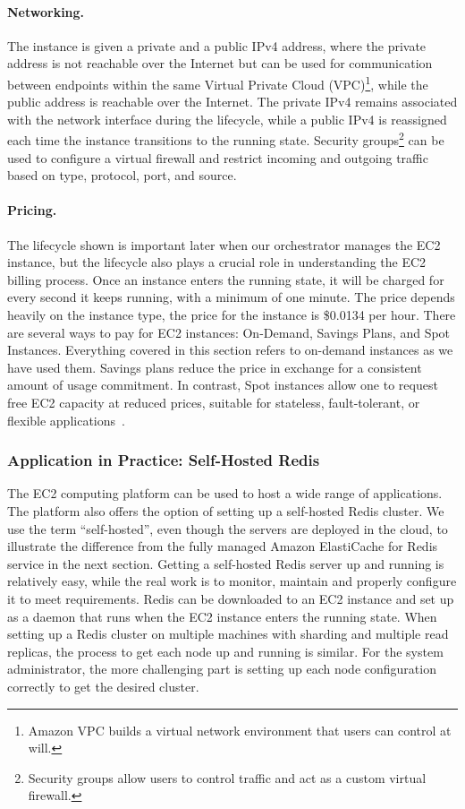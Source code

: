 \paragraph{Networking.} The instance is given a private and a public IPv4 address, where the private address is not reachable over the Internet but can be used for communication between endpoints within the same Virtual Private Cloud (VPC)\footnote{Amazon VPC builds a virtual network environment that users can control at will.}, while the public address is reachable over the Internet. The private IPv4 remains associated with the network interface during the lifecycle, while a public IPv4 is reassigned each time the instance transitions to the running state. Security groups\footnote{Security groups allow users to control traffic and act as a custom virtual firewall.} can be used to configure a virtual firewall and restrict incoming and outgoing traffic based on type, protocol, port, and source.

\paragraph{Pricing.} The lifecycle shown is important later when our orchestrator manages the EC2 instance, but the lifecycle also plays a crucial role in understanding the EC2 billing process. Once an instance enters the running state, it will be charged for every second it keeps running, with a minimum of one minute. The price depends heavily on the instance type, the price for the  instance is \$0.0134 per hour. There are several ways to pay for EC2 instances: On-Demand, Savings Plans, and Spot Instances. Everything covered in this section refers to on-demand instances as we have used them. Savings plans reduce the price in exchange for a consistent amount of usage commitment. In contrast, Spot instances allow one to request free EC2 capacity at reduced prices, suitable for stateless, fault-tolerant, or flexible applications~\cite{noauthor_secure_nodate}.

\subsubsection{Application in Practice: Self-Hosted Redis}
The EC2 computing platform can be used to host a wide range of applications. The platform also offers the option of setting up a self-hosted Redis cluster. We use the term ``self-hosted'', even though the servers are deployed in the cloud, to illustrate the difference from the fully managed Amazon ElastiCache for Redis service in the next section. Getting a self-hosted Redis server up and running is relatively easy, while the real work is to monitor, maintain and properly configure it to meet requirements. Redis can be downloaded to an EC2 instance and set up as a daemon that runs when the EC2 instance enters the running state. When setting up a Redis cluster on multiple machines with sharding and multiple read replicas, the process to get each node up and running is similar. For the system administrator, the more challenging part is setting up each node configuration correctly to get the desired cluster.

